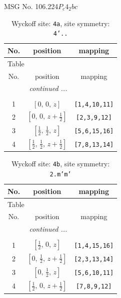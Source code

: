 \documentclass[fleqn,8pt]{jsarticle}
\begin{document}
\setcounter{MaxMatrixCols}{32}

\renewcommand{\tablename}{Table~}
\renewcommand{\figurename}{Figure~}
\begin{center}
\LARGE
MSG No. 106.224\quad$P_{c}4_{2}bc$
\end{center}
\renewcommand{\arraystretch}{1.2}
\begin{longtable}{ccc}
\caption{Wyckoff site: {\tt 4a}, site symmetry: {\tt 4'..}}
 \\
 \hline \hline
No. & position & mapping \\ \hline \endfirsthead

\multicolumn{2}{l}{\tablename\ \thetable{}} \\
 \hline \hline
No. & position & mapping \\ \hline \endhead

 \hline \hline
\multicolumn{2}{r}{\footnotesize\it continued ...} \\ \endfoot

 \hline \hline
\multicolumn{2}{r}{} \\ \endlastfoot

1 & $\left[ 0,\, 0,\, z \right]$ & {\tt [1,4,10,11]} \\ \hline
2 & $\left[ 0,\, 0,\, z + \frac{1}{2} \right]$ & {\tt [2,3,9,12]} \\ \hline
3 & $\left[ \frac{1}{2},\, \frac{1}{2},\, z \right]$ & {\tt [5,6,15,16]} \\ \hline
4 & $\left[ \frac{1}{2},\, \frac{1}{2},\, z + \frac{1}{2} \right]$ & {\tt [7,8,13,14]} \\
\end{longtable}
\renewcommand{\arraystretch}{1.2}
\begin{longtable}{ccc}
\caption{Wyckoff site: {\tt 4b}, site symmetry: {\tt 2.m'm'}}
 \\
 \hline \hline
No. & position & mapping \\ \hline \endfirsthead

\multicolumn{2}{l}{\tablename\ \thetable{}} \\
 \hline \hline
No. & position & mapping \\ \hline \endhead

 \hline \hline
\multicolumn{2}{r}{\footnotesize\it continued ...} \\ \endfoot

 \hline \hline
\multicolumn{2}{r}{} \\ \endlastfoot

1 & $\left[ \frac{1}{2},\, 0,\, z \right]$ & {\tt [1,4,15,16]} \\ \hline
2 & $\left[ 0,\, \frac{1}{2},\, z + \frac{1}{2} \right]$ & {\tt [2,3,13,14]} \\ \hline
3 & $\left[ 0,\, \frac{1}{2},\, z \right]$ & {\tt [5,6,10,11]} \\ \hline
4 & $\left[ \frac{1}{2},\, 0,\, z + \frac{1}{2} \right]$ & {\tt [7,8,9,12]} \\
\end{longtable}
\end{document}
